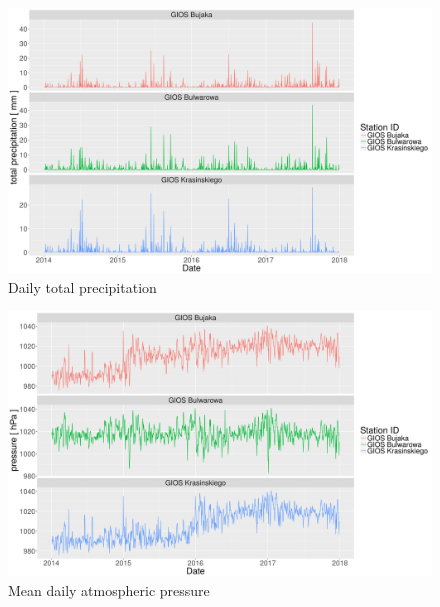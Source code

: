 \begin{landscape}
\begin{figure}[htp]
\centering
  \includegraphics[width=\linewidth]{figures/dataset/trend/precip_total_yearly_trend.png}
  \caption{Daily total precipitation}
  \label{fig:dataset-trend-precip-total}
\end{figure}
\end{landscape}
\begin{landscape}
\begin{figure}[htp]
\centering
  \includegraphics[width=\linewidth]{figures/dataset/trend/pressure_yearly_trend.png}
  \caption{Mean daily atmospheric pressure}
  \label{fig:dataset-trend-pressure}
\end{figure}
\end{landscape}
